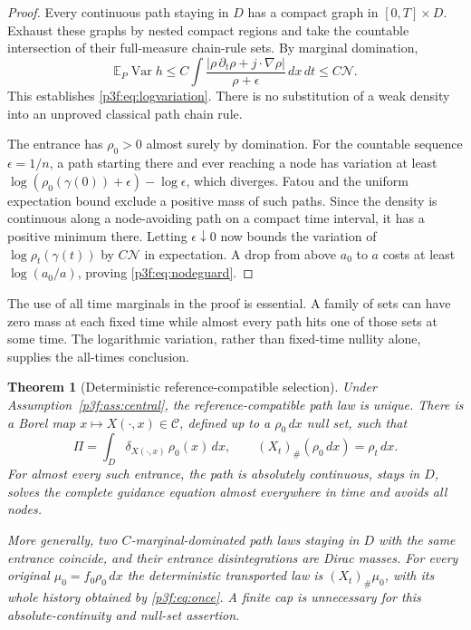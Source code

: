 \documentclass[11pt]{article}
\numberwithin{equation}{section}
\newtheorem{theorem}{Theorem}[section]
\theoremstyle{definition}
\theoremstyle{remark}
\begin{document}
\begin{proof}
Every continuous path staying in $D$ has a compact graph in
$[0,T]\times D$. Exhaust these graphs by nested compact regions and
take the countable intersection of their full-measure chain-rule
sets. By marginal domination,
\[
 \mathbb E_P\operatorname{Var}h
 \leq C\int
       \frac{|\rho\,\partial_t\rho+j\cdot\nabla\rho|}
                         {\rho+\epsilon}\,dx\,dt
 \leq C\mathcal N .
\]
This establishes \eqref{p3f:eq:logvariation}. There is no substitution
of a weak density into an unproved classical path chain rule.

The entrance has $\rho_0>0$ almost surely by domination.
For the countable sequence $\epsilon=1/n$, a path starting there and
ever reaching a node has variation at least
$\log(\rho_0(\gamma(0))+\epsilon)-\log\epsilon$, which diverges.
Fatou and the uniform expectation bound exclude a positive mass of
such paths. Since the density is continuous along a node-avoiding
path on a compact time interval, it has a positive minimum there.
Letting $\epsilon\downarrow0$ now bounds the variation of
$\log\rho_t(\gamma(t))$ by $C\mathcal N$ in expectation. A drop from
above $a_0$ to $a$ costs at least $\log(a_0/a)$, proving
\eqref{p3f:eq:nodeguard}.
\end{proof}

The use of all time marginals in the proof is essential. A family of
sets can have zero mass at each fixed time while almost every path
hits one of those sets at some time. The logarithmic variation, rather
than fixed-time nullity alone, supplies the all-times conclusion.

\begin{theorem}[Deterministic reference-compatible selection]
\label{p3f:thm:deterministic}
Under Assumption~\ref{p3f:ass:central}, the reference-compatible path law
is unique. There is a Borel map
$x\mapsto X(\cdot,x)\in\mathcal C$, defined up to a $\rho_0\,dx$ null
set, such that
\begin{equation}\label{p3f:eq:detflow}
 \Pi=\int_D\delta_{X(\cdot,x)}\,\rho_0(x)\,dx,
 \qquad (X_t)_\#(\rho_0\,dx)=\rho_t\,dx .
\end{equation}
For almost every such entrance, the path is absolutely continuous,
stays in $D$, solves the complete guidance equation almost everywhere
in time and avoids all nodes.

More generally, two $C$-marginal-dominated path laws staying in $D$
with the same entrance coincide, and their entrance disintegrations
are Dirac masses. For every original $\mu_0=f_0\rho_0\,dx$ the
deterministic transported law is $(X_t)_\#\mu_0$, with its whole
history obtained by \eqref{p3f:eq:once}. A finite cap is unnecessary
for this absolute-continuity and null-set assertion.
\end{theorem}
\end{document}
